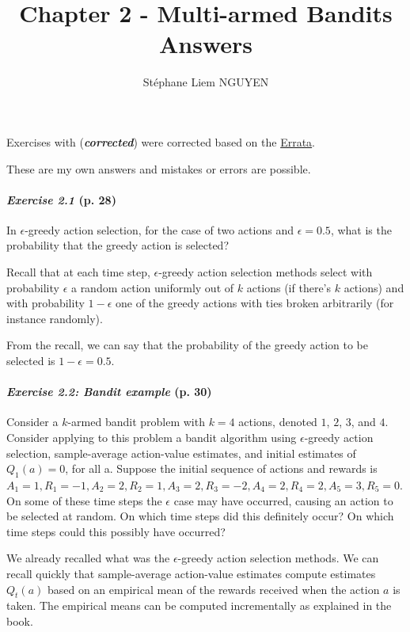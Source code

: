 \documentclass[10pt,a4paper]{article}
\title{Chapter 2 - Multi-armed Bandits Answers}
\author{Stéphane Liem NGUYEN}
\begin{document}
\maketitle

Exercises with (\textbf{\textit{corrected}}) were corrected based on the \href{http://incompleteideas.net/book/errata.html}{Errata}.

These are my own answers and mistakes or errors are possible.

\paragraph{\textit{Exercise 2.1} (p. 28)} In $\epsilon$-greedy action selection, for the case of two actions and $\epsilon = 0.5$, what is
the probability that the greedy action is selected?

\bigskip
Recall that at each time step, $\epsilon$-greedy action selection methods select with probability $\epsilon$ a random action uniformly out of $k$ actions (if there's $k$ actions) and with probability $1-\epsilon$ one of the greedy actions with ties broken arbitrarily (for instance randomly).

From the recall, we can say that the probability of the greedy action to be selected   is $1-\epsilon = 0.5$.

\paragraph{\textit{Exercise 2.2: Bandit example} (p. 30)} Consider a $k$-armed bandit problem with $k = 4$ actions,
denoted $1$, $2$, $3$, and $4$. Consider applying to this problem a bandit algorithm using
$\epsilon$-greedy action selection, sample-average action-value estimates, and initial estimates
of $Q_1(a) = 0$, for all a. Suppose the initial sequence of actions and rewards is $A_1 = 1,
R_1 = -1, A_2 = 2, R_2 = 1, A_3 = 2, R_3 = -2, A_4 = 2, R_4 = 2, A_5 = 3, R_5 = 0$. On some of these time steps the $\epsilon$ case may have occurred, causing an action to be selected at
random. On which time steps did this definitely occur? On which time steps could this
possibly have occurred?

\bigskip
We already recalled what was the $\epsilon$-greedy action selection methods. We can recall quickly that sample-average action-value estimates compute estimates $Q_t(a)$ based on an empirical mean of the rewards received when the action $a$ is taken. The empirical means can be computed incrementally as explained in the book.
\end{document}
